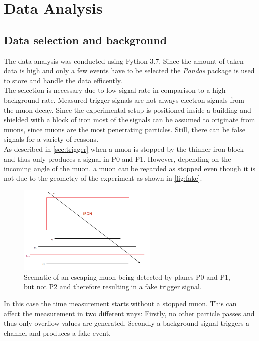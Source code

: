 \chapter{Data Analysis}
\label{sec:data_analysis}
\section{Data selection and background}
The data analysis was conducted using Python 3.7. Since the amount of taken data is high and 
only a few events have to be selected the \textit{Pandas} package \cite{pandas} is used to store and handle
the data efficently. \\
The selection is necessary due to low signal rate in comparison to a high background rate.
Measured trigger signals are not always electron signals from the muon decay. Since the experimental 
setup is positioned inside a building and shielded with a block of iron most of the signals 
can be assumed to originate from muons, since muons are the most penetrating particles. Still,
there can be false signals for a variety of reasons. \\
As described in \autoref{sec:trigger} when a muon is stopped by the thinner iron block and thus only 
produces a signal in P0 and P1. However, depending on the incoming angle of the muon, 
a muon can be regarded as stopped even though it is not due to the geometry of the experiment as shown in \autoref{fig:fake}.
\begin{figure}
    \centering
    \includegraphics[width=0.6\textwidth]{figures/falsestopping.png}
    \caption{Scematic of an escaping muon being detected by planes P0 and P1, but not P2 and therefore resulting in a fake trigger signal.}
    \label{fig:fake}
\end{figure}
In this case the time measurement starts without a stopped muon. This can affect the measurement in two
different ways: Firstly, no other particle passes and thus only overflow values are generated. Secondly 
a background signal triggers a channel and produces a fake event.\\
